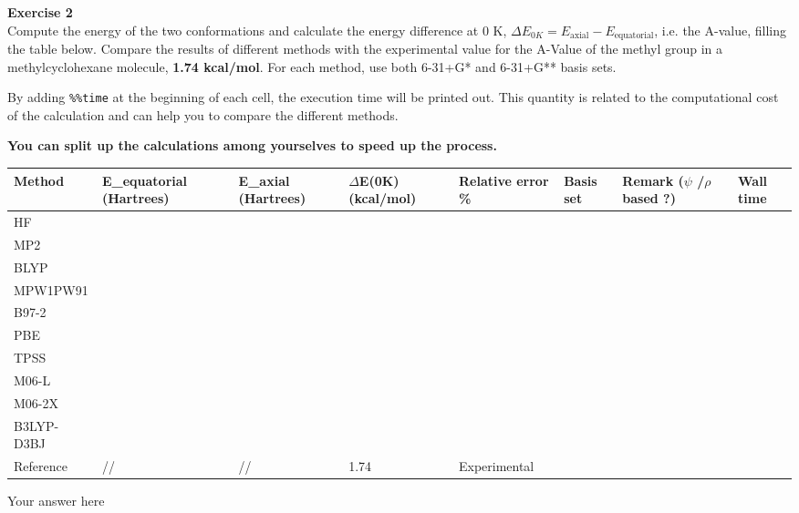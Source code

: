 \documentclass{article}
\begin{document}
\begin{mdframed}
\textbf{Exercise 2}\\
Compute the energy of the two conformations and calculate the energy difference at 0 K, $\Delta E_{0K} = E_{\text{axial}} - E_{\text{equatorial}}$, i.e. the A-value, filling the table below. Compare the results of different methods with the experimental value for the  A-Value of the methyl group in a methylcyclohexane molecule, \textbf{1.74 kcal/mol}. For each method, use both 6-31+G* and 6-31+G** basis sets.

By adding \texttt{\%\%time} at the beginning of each cell, the execution time will be printed out. This quantity is related to the computational cost of the calculation and can help you to compare the different methods.

\textbf{You can split up the calculations among yourselves to speed up the process.}

\bigskip\noindent
\begin{tabular}{p{}p{}p{}p{}p{}p{}p{}p{}}
\toprule
Method & E\_equatorial (Hartrees) & E\_axial (Hartrees) & $\Delta$E(0K) (kcal/mol) & Relative error \% & Basis set & Remark ($\psi$ /$\rho$ based ?) & Wall time \\
\hline
HF &  &  &  &  &  &  &  \\
MP2 &  &  &  &  &  &  &  \\
BLYP &  &  &  &  &  &  &  \\
MPW1PW91 &  &  &  &  &  &  &  \\
B97-2 &  &  &  &  &  &  &  \\
PBE &  &  &  &  &  &  &  \\
TPSS &  &  &  &  &  &  &  \\
M06-L &  &  &  &  &  &  &  \\
M06-2X &  &  &  &  &  &  &  \\
B3LYP-D3BJ &  &  &  &  &  &  &  \\
Reference & // & // & 1.74 & Experimental &  &  &  \\
\bottomrule
\end{tabular}

\bigskip
\end{mdframed}

Your answer here
\end{document}
